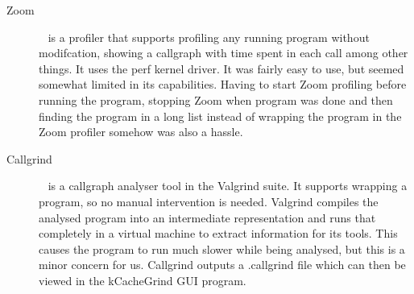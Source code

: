 \begin{description}
\item[Zoom]~\citep{zoomprofiler} is a profiler that supports profiling any running program without modifcation, showing a callgraph with time spent in each call among other things.
It uses the perf kernel driver. It was fairly easy to use, but seemed somewhat limited in its capabilities.
Having to start Zoom profiling before running the program, stopping Zoom when program was done and then finding the program in a long list instead of wrapping the program in the Zoom profiler somehow was also a hassle.
\item[Callgrind]~\citep{callgrind} is a callgraph analyser tool in the Valgrind suite.
It supports wrapping a program, so no manual intervention is needed.
Valgrind compiles the analysed program into an intermediate representation and runs that completely in a virtual machine to extract information for its tools.
This causes the program to run much slower while being analysed, but this is a minor concern for us.
Callgrind outputs a .callgrind file which can then be viewed in the kCacheGrind GUI program.
\end{description}